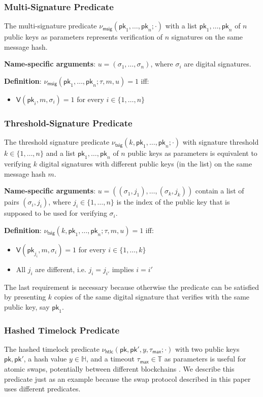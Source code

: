\documentclass{article}
\newcommand{\sigver}[0]{\mathsf{V}}
\newcommand{\pubkey}[0]{\mathsf{pk}}
\begin{document}
\subsubsection{Multi-Signature Predicate}
The multi-signature predicate
$\nu_\mathsf{msig}(\pubkey_1,\ldots,\pubkey_n;\cdot)$ with a list $\pubkey_1,\ldots,\pubkey_n$ of $n$ public keys as parameters represents verification of $n$ signatures on the same message hash. \medskip

\noindent\textbf{Name-specific arguments}: $u=(\sigma_1,\ldots,\sigma_n)$, where $\sigma_i$ are digital signatures.\medskip

\noindent\textbf{Definition}: $\nu_\mathsf{msig}(\pubkey_1,\ldots,\pubkey_n;\tau,m,u)=1$ iff:
\begin{itemize}
\item $\sigver(\pubkey_i,m,\sigma_i)=1$ for every $i\in\{1,\ldots,n\}$
\end{itemize}

\subsubsection{Threshold-Signature Predicate}
The threshold signature predicate
$\nu_\mathsf{tsig}(k,\pubkey_1,\ldots,\pubkey_n;\cdot)$ with signature threshold $k\in\{1,\ldots,n\}$ and a list $\pubkey_1,\ldots,\pubkey_n$ of $n$ public keys as parameters is equivalent to verifying $k$ digital signatures with different public keys (in the list) on the same message hash $m$. \medskip

\noindent\textbf{Name-specific arguments}: $u=((\sigma_1,j_1),\ldots,(\sigma_k,j_k))$ contain a list of pairs $(\sigma_i,j_i)$, where $j_i\in\{1,\ldots,n\}$ is the index of the public key that is supposed to be used for verifying $\sigma_i$. \medskip

\noindent\textbf{Definition}: $\nu_\mathsf{tsig}(k,\pubkey_1,\ldots,\pubkey_n;\tau,m,u)=1$ iff:
\begin{itemize}
\item[1.] $\sigver(\pubkey_{j_i},m,\sigma_i)=1$ for every $i\in\{1,\ldots,k\}$
\item[2.] All $j_i$ are different, i.e. $j_i=j_{i'}$ implies $i=i'$
\end{itemize}
The last requirement is necessary because otherwise the predicate can be satisfied by presenting $k$ copies of the same digital signature that verifies with the same public key, say $\pubkey_1$.

\subsubsection{Hashed Timelock Predicate}
The hashed timelock predicate
$\nu_\mathsf{htlc}(\pubkey,\pubkey',y,\tau_\mathsf{max};\cdot)$ with two public keys $\pubkey,\pubkey'$, a hash value $y\in\mathbb{H}$, and a timeout $\tau_\mathsf{max}\in\mathbb{T}$ as parameters is useful for atomic swaps, potentially between different blockchains \cite{Herl18,Bitc18a,Bitc18b}. We describe this predicate just as an example because the swap protocol described in this paper uses different predicates. \medskip
\end{document}
